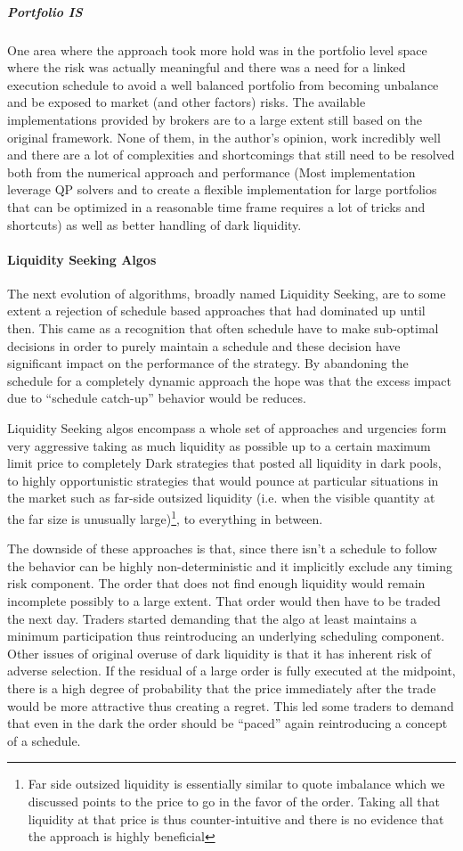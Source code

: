 \subparagraph{Portfolio IS}
One area where the approach took more hold was in the portfolio level space where the risk was actually  meaningful and there was a need for a linked execution schedule to avoid a well balanced portfolio from becoming unbalance and be exposed to market (and other factors) risks. The available implementations provided by brokers are to a large extent still based on the original framework. None of them, in the author's opinion, work incredibly well and there are a lot of complexities and shortcomings that still need to be resolved both from the numerical approach and performance (Most implementation leverage QP solvers and to create a flexible implementation for large portfolios that can be optimized in a reasonable time frame requires a lot of tricks and shortcuts) as well as better handling of dark liquidity. 

\paragraph{Liquidity Seeking Algos}
The next evolution of algorithms, broadly named Liquidity Seeking, are to some extent a rejection of schedule based approaches that had dominated up until then. This came as a recognition that often schedule have to make sub-optimal decisions in order to purely maintain a schedule and these decision have significant impact on the performance of the strategy. By abandoning the schedule for a completely dynamic approach the hope was that the excess impact due to ``schedule catch-up'' behavior would be reduces.

Liquidity Seeking algos encompass a whole set of approaches and urgencies form very aggressive taking as much liquidity as possible up to a certain maximum limit price to completely Dark strategies that posted all liquidity in dark pools, to highly opportunistic strategies that would pounce at particular situations in the market such as far-side outsized liquidity (i.e. when the visible quantity at the far size is unusually large)\footnote{Far side outsized liquidity is essentially similar to quote imbalance which we discussed points to the price to go in the favor of the order. Taking all that liquidity at that price is thus counter-intuitive and there is no evidence that the approach is highly beneficial}, to everything in between.

The downside of these approaches is that, since there isn't a schedule to follow the behavior can be highly non-deterministic and it implicitly  exclude any timing risk component. The order that does not find enough liquidity would remain incomplete possibly to a large extent. That order would then have to be traded the next day. Traders started demanding that the algo at least maintains a minimum participation thus reintroducing an underlying scheduling component. Other issues of original overuse of dark liquidity is that it has inherent risk of adverse selection. If the residual of a large order is fully executed at the midpoint, there is a high degree of probability that the price immediately after the trade would be more attractive thus creating a regret. This led some traders to demand that even in the dark the order should be ``paced'' again reintroducing a concept of a schedule.

